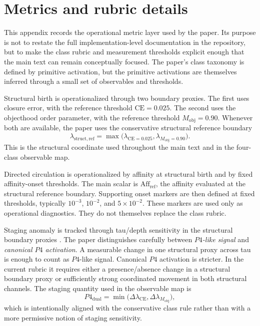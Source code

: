 \documentclass[11pt]{article}
\begin{document}
\appendix
\section{Metrics and rubric details}
\label{app:metrics-rubric}

This appendix records the operational metric layer used by the paper. Its purpose is not to restate the full implementation-level documentation in the repository, but to make the class rubric and measurement thresholds explicit enough that the main text can remain conceptually focused. The paper's class taxonomy is defined by primitive activation, but the primitive activations are themselves inferred through a small set of observables and thresholds.

Structural birth is operationalized through two boundary proxies. The first uses closure error, with the reference threshold $\mathrm{CE}=0.025$. The second uses the objecthood order parameter, with the reference threshold $M_{\mathrm{obj}}=0.90$. Whenever both are available, the paper uses the conservative structural reference boundary
\[
\lambda_{\mathrm{struct,ref}}
=
\max\!\bigl(\lambda_{\mathrm{CE}=0.025},\lambda_{M_{\mathrm{obj}}=0.90}\bigr).
\]
This is the structural coordinate used throughout the main text and in the four-class observable map.

Directed circulation is operationalized by affinity at structural birth and by fixed affinity-onset thresholds. The main scalar is $\mathrm{Aff}_{\mathrm{ref}}$, the affinity evaluated at the structural reference boundary. Supporting onset markers are then defined at fixed thresholds, typically $10^{-3}$, $10^{-2}$, and $5\times 10^{-2}$. These markers are used only as operational diagnostics. They do not themselves replace the class rubric.

Staging anomaly is tracked through tau/depth sensitivity in the structural boundary proxies \cite{landim_2019,defenu_2021}. The paper distinguishes carefully between \emph{$P4$-like signal} and \emph{canonical $P4$ activation}. A measurable change in one structural proxy across tau is enough to count as $P4$-like signal. Canonical $P4$ activation is stricter. In the current rubric it requires either a presence/absence change in a structural boundary proxy or sufficiently strong coordinated movement in both structural channels. The staging quantity used in the observable map is
\[
P4_{\mathrm{dual}}=\min\!\bigl(\Delta\lambda_{\mathrm{CE}},\Delta\lambda_{M_{\mathrm{obj}}}\bigr),
\]
which is intentionally aligned with the conservative class rule rather than with a more permissive notion of staging sensitivity.
\end{document}

